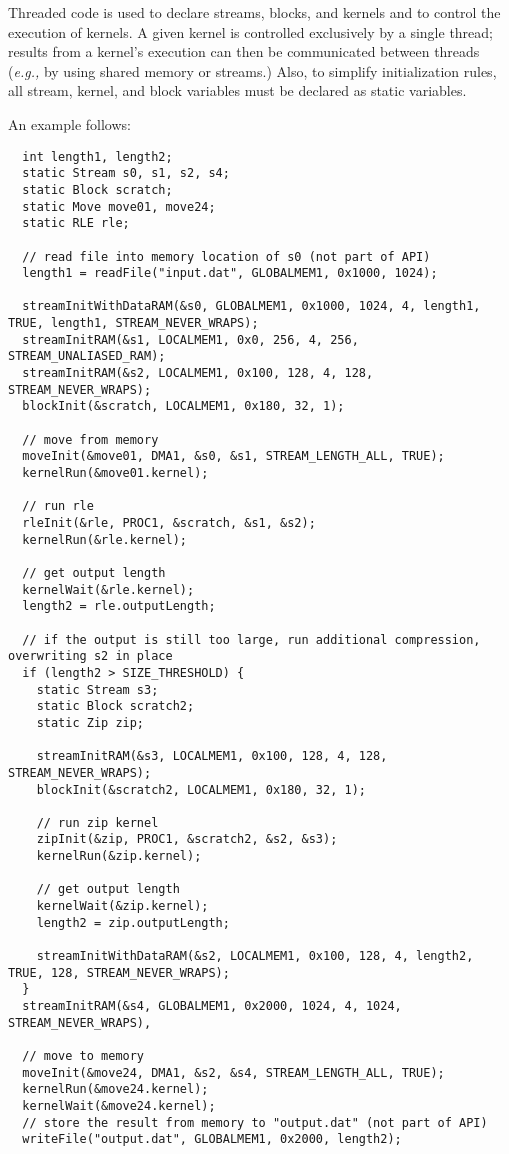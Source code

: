 Threaded code is used to declare streams, blocks, and kernels and to
control the execution of kernels.  A given kernel is controlled
exclusively by a single thread; results from a kernel's execution can
then be communicated between threads ({\it e.g.,} by using shared
memory or streams.)  Also, to simplify initialization rules, all
stream, kernel, and block variables must be declared as static
variables.

An example follows:

{\small
\begin{verbatim}
  int length1, length2;
  static Stream s0, s1, s2, s4;
  static Block scratch;
  static Move move01, move24;
  static RLE rle;

  // read file into memory location of s0 (not part of API)
  length1 = readFile("input.dat", GLOBALMEM1, 0x1000, 1024);

  streamInitWithDataRAM(&s0, GLOBALMEM1, 0x1000, 1024, 4, length1, TRUE, length1, STREAM_NEVER_WRAPS);
  streamInitRAM(&s1, LOCALMEM1, 0x0, 256, 4, 256, STREAM_UNALIASED_RAM);
  streamInitRAM(&s2, LOCALMEM1, 0x100, 128, 4, 128, STREAM_NEVER_WRAPS);
  blockInit(&scratch, LOCALMEM1, 0x180, 32, 1);

  // move from memory
  moveInit(&move01, DMA1, &s0, &s1, STREAM_LENGTH_ALL, TRUE);
  kernelRun(&move01.kernel);
  
  // run rle
  rleInit(&rle, PROC1, &scratch, &s1, &s2);
  kernelRun(&rle.kernel);

  // get output length
  kernelWait(&rle.kernel);
  length2 = rle.outputLength;
  
  // if the output is still too large, run additional compression, overwriting s2 in place
  if (length2 > SIZE_THRESHOLD) {
    static Stream s3;
    static Block scratch2;
    static Zip zip;

    streamInitRAM(&s3, LOCALMEM1, 0x100, 128, 4, 128, STREAM_NEVER_WRAPS);
    blockInit(&scratch2, LOCALMEM1, 0x180, 32, 1);

    // run zip kernel
    zipInit(&zip, PROC1, &scratch2, &s2, &s3);
    kernelRun(&zip.kernel);
    
    // get output length
    kernelWait(&zip.kernel);
    length2 = zip.outputLength;

    streamInitWithDataRAM(&s2, LOCALMEM1, 0x100, 128, 4, length2, TRUE, 128, STREAM_NEVER_WRAPS);
  }
  streamInitRAM(&s4, GLOBALMEM1, 0x2000, 1024, 4, 1024, STREAM_NEVER_WRAPS),
  
  // move to memory
  moveInit(&move24, DMA1, &s2, &s4, STREAM_LENGTH_ALL, TRUE);
  kernelRun(&move24.kernel);
  kernelWait(&move24.kernel);
  // store the result from memory to "output.dat" (not part of API)
  writeFile("output.dat", GLOBALMEM1, 0x2000, length2); 
\end{verbatim}}

